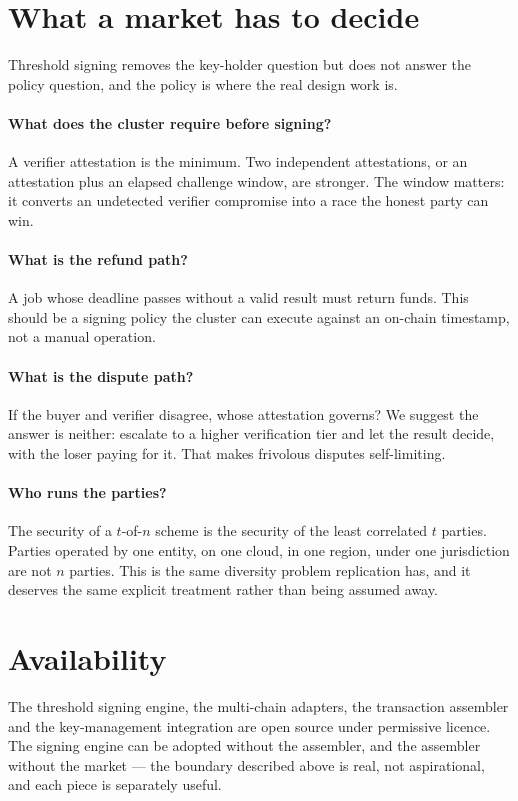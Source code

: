 \documentclass[11pt,a4paper]{article}
\begin{document}
\section{What a market has to decide}

Threshold signing removes the key-holder question but does not answer the policy
question, and the policy is where the real design work is.

\paragraph{What does the cluster require before signing?} A verifier attestation
is the minimum. Two independent attestations, or an attestation plus an elapsed
challenge window, are stronger. The window matters: it converts an undetected
verifier compromise into a race the honest party can win.

\paragraph{What is the refund path?} A job whose deadline passes without a valid
result must return funds. This should be a signing policy the cluster can execute
against an on-chain timestamp, not a manual operation.

\paragraph{What is the dispute path?} If the buyer and verifier disagree, whose
attestation governs? We suggest the answer is neither: escalate to a higher
verification tier and let the result decide, with the loser paying for it. That
makes frivolous disputes self-limiting.

\paragraph{Who runs the parties?} The security of a $t$-of-$n$ scheme is the
security of the least correlated $t$ parties. Parties operated by one entity, on
one cloud, in one region, under one jurisdiction are not $n$ parties. This is the
same diversity problem replication has, and it deserves the same explicit
treatment rather than being assumed away.

\section{Availability}

The threshold signing engine, the multi-chain adapters, the transaction assembler
and the key-management integration are open source under permissive licence. The
signing engine can be adopted without the assembler, and the assembler without
the market --- the boundary described above is real, not aspirational, and each
piece is separately useful.
\end{document}
